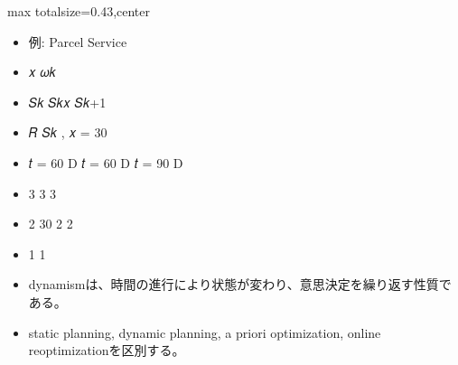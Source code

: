 \clearpage
{}
\begin{minipage}[t]{0.405\textwidth}
\begin{adjustbox}{max totalsize={\textwidth}{0.43\textheight},center}
\begin{minipage}{\textwidth}\scriptsize
{}\begin{itemize}
\item 例: Parcel Service
\item 𝑥 𝜔𝑘
\item 𝑆𝑘 𝑆𝑘𝑥 𝑆𝑘+1
\item 𝑅 𝑆𝑘 , 𝑥 = 30
\item 𝑡 = 60 D 𝑡 = 60 D 𝑡 = 90 D
\item 3 3 3
\item 2 30 2 2
\item 1 1
\end{itemize}\begin{itemize}
\item dynamismは、時間の進行により状態が変わり、意思決定を繰り返す性質である。
\item static planning, dynamic planning, a priori optimization, online reoptimizationを区別する。
\end{itemize}
\end{minipage}
\end{adjustbox}
\end{minipage}\hfill
